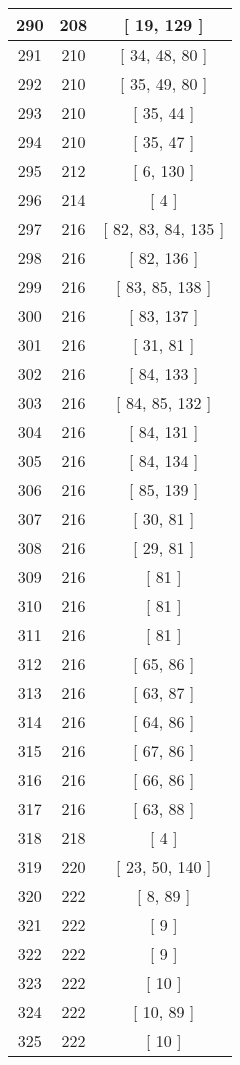 \begin{center}
\begin{longtable}[H]{|| c c c ||}
\hline
290 & 208 & [ 19, 129 ] \\ 
\hline
291 & 210 & [ 34, 48, 80 ] \\ 
\hline
292 & 210 & [ 35, 49, 80 ] \\ 
\hline
293 & 210 & [ 35, 44 ] \\ 
\hline
294 & 210 & [ 35, 47 ] \\ 
\hline
295 & 212 & [ 6, 130 ] \\ 
\hline
296 & 214 & [ 4 ] \\ 
\hline
297 & 216 & [ 82, 83, 84, 135 ] \\ 
\hline
298 & 216 & [ 82, 136 ] \\ 
\hline
299 & 216 & [ 83, 85, 138 ] \\ 
\hline
300 & 216 & [ 83, 137 ] \\ 
\hline
301 & 216 & [ 31, 81 ] \\ 
\hline
302 & 216 & [ 84, 133 ] \\ 
\hline
303 & 216 & [ 84, 85, 132 ] \\ 
\hline
304 & 216 & [ 84, 131 ] \\ 
\hline
305 & 216 & [ 84, 134 ] \\ 
\hline
306 & 216 & [ 85, 139 ] \\ 
\hline
307 & 216 & [ 30, 81 ] \\ 
\hline
308 & 216 & [ 29, 81 ] \\ 
\hline
309 & 216 & [ 81 ] \\ 
\hline
310 & 216 & [ 81 ] \\ 
\hline
311 & 216 & [ 81 ] \\ 
\hline
312 & 216 & [ 65, 86 ] \\ 
\hline
313 & 216 & [ 63, 87 ] \\ 
\hline
314 & 216 & [ 64, 86 ] \\ 
\hline
315 & 216 & [ 67, 86 ] \\ 
\hline
316 & 216 & [ 66, 86 ] \\ 
\hline
317 & 216 & [ 63, 88 ] \\ 
\hline
318 & 218 & [ 4 ] \\ 
\hline
319 & 220 & [ 23, 50, 140 ] \\ 
\hline
320 & 222 & [ 8, 89 ] \\ 
\hline
321 & 222 & [ 9 ] \\ 
\hline
322 & 222 & [ 9 ] \\ 
\hline
323 & 222 & [ 10 ] \\ 
\hline
324 & 222 & [ 10, 89 ] \\ 
\hline
325 & 222 & [ 10 ] \\ 

\end{longtable}
\end{center}
